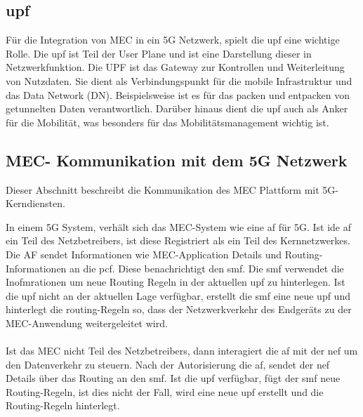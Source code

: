 \documentclass[runningheads]{llncs}
\numberwithin{figure}{section}
\begin{document}
\subsection{\acrfull{upf}}
Für die Integration von MEC in ein 5G Netzwerk, spielt die \acrfull{upf} eine wichtige Rolle. Die \acrshort{upf} ist Teil der User Plane
und ist eine Darstellung dieser in Netzwerkfunktion. Die UPF ist das Gateway zur Kontrollen und Weiterleitung von Nutzdaten. 
Sie dient als Verbindungspunkt für die mobile Infrastruktur und das Data Network (DN). Beispielsweise ist es für das packen und entpacken von 
getunnelten Daten verantwortlich. Darüber hinaus dient die \acrshort{upf} auch als Anker für die Mobilität, was besonders für das Mobilitätsmanagement wichtig ist.
\cite{Leitfaden5GCampusnetze2020}
\subsection{MEC- Kommunikation mit dem 5G Netzwerk}
Dieser Abschnitt beschreibt die Kommunikation des MEC
Plattform mit 5G-Kerndiensten.

In einem 5G System, verhält sich das MEC-System wie eine \acrfull{af} für 5G. Ist ide \acrshort{af} ein Teil des Netzbetreibers, ist diese 
Registriert als ein Teil des Kernnetzwerkes. Die AF sendet Informationen wie MEC-Application Details und Routing-Informationen 
an die \acrshort{pcf}. Diese benachrichtigt den \acrshort{smf}. Die \acrlong{smf} verwendet die Inofmrationen um neue Routing Regeln in der
aktuellen \acrshort{upf} zu hinterlegen. Ist die \acrshort{upf} nicht an der aktuellen Lage verfügbar, erstellt die \acrshort{smf} eine 
neue \acrshort{upf} und hinterlegt die routing-Regeln so, dass der Netzwerkverkehr des Endgeräts zu der MEC-Anwendung weitergeleitet wird.
\\
\\
Ist das MEC nicht Teil des Netzbetreibers, dann interagiert die \acrshort{af} mit der \acrshort{nef} um den Datenverkehr zu steuern.
Nach der Autorisierung die \acrshort{af}, sendet der \acrshort{nef} Details über das Routing an den \acrshort{smf}. Ist die \acrshort{upf}
verfügbar, fügt der \acrshort{smf} neue Routing-Regeln, ist dies nicht der Fall, wird eine neue \acrshort{upf} erstellt und die Routing-Regeln
hinterlegt.
\end{document}
